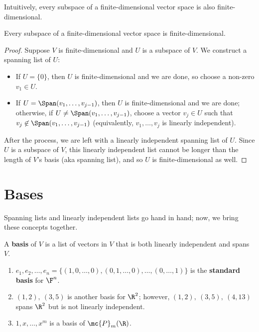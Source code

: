 \documentclass[math0540-lecture-notes.tex]{subfiles}
\begin{document}
Intuitively, every subspace of a finite-dimensional vector space is also finite-dimensional.
\begin{proposition}{}
  Every subspace of a finite-dimensional vector space is finite-dimensional.
\end{proposition}
\begin{proof}[Proof]
  Suppose $V$ is finite-dimensional and $U$ is a subspace of $V$. We construct a spanning list of $U$:
  \begin{itemize}
    \item If $U=\{ 0 \}$, then $U$ is finite-dimensional and we are done, so choose a non-zero
      $v_1\in U$.
    \item If $U=\Span(v_1,\ldots,v_{j-1})$, then $U$ is finite-dimensional and we are done;
      otherwise, if $U\neq \Span(v_1,\ldots,v_{j-1})$, choose a vector $v_j\in U$ such that
      $v_j\not\in \Span(v_1,\ldots,v_{j-1})$ (equivalently, $v_1,\ldots,v_j$ is linearly
      independent).
  \end{itemize}
  After the process, we are left with a linearly independent spanning list of $U$. Since $U$ is a
  subspace of $V$, this linearly independent list cannot be longer than the length of $V$'s basis
  (aka spanning list), and so $U$ is finite-dimensional as well.
\end{proof}


\section{Bases}

Spanning lists and linearly independent lists go hand in hand; now, we bring these concepts
together.
\begin{definition}[Basis]{}
  A \textbf{basis} of $V$ is a list of vectors in $V$ that is both linearly independent and spans
  $V$.
\end{definition}

\begin{example}
  \begin{enumerate}
    \item $ e_1,e_2,\ldots,e_n=\{ (1,0,\ldots,0), (0,1,\ldots,0), \ldots,(0,\ldots,1) \}$ is the
      \textbf{standard basis} for $\F^{n}$.
    \item $(1,2),\ (3,5)$ is another basis for $\R^{2}$; however, $(1,2),\ (3,5),\ (4,13)$ spans
      $\R^2$ but is not linearly independent.
    \item $1,x,\ldots,x^{m}$ is a basis of $\mc{P}_m(\R)$.
  \end{enumerate}
\end{example}
\end{document}
